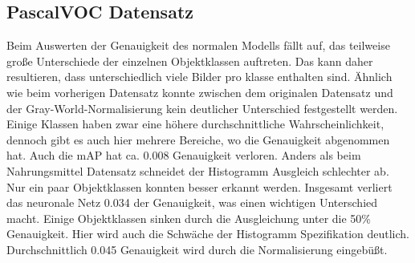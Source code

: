 \documentclass[a4paper,12pt,oneside]{article}
\begin{document}
\subsection{PascalVOC Datensatz}
Beim Auswerten der Genauigkeit des normalen Modells fällt auf, das teilweise große Unterschiede der einzelnen Objektklassen auftreten. Das kann daher resultieren, dass unterschiedlich viele Bilder pro klasse enthalten sind. Ähnlich wie beim vorherigen Datensatz konnte zwischen dem originalen Datensatz und der Gray-World-Normalisierung kein deutlicher Unterschied festgestellt werden. Einige Klassen haben zwar eine höhere durchschnittliche Wahrscheinlichkeit, dennoch gibt es auch hier mehrere Bereiche, wo die Genauigkeit abgenommen hat. Auch die mAP hat ca. 0.008 Genauigkeit verloren. Anders als beim Nahrungsmittel Datensatz schneidet der Histogramm Ausgleich schlechter ab. Nur ein paar Objektklassen konnten besser erkannt werden. Insgesamt verliert das neuronale Netz 0.034 der Genauigkeit, was einen wichtigen Unterschied macht. Einige Objektklassen sinken durch die Ausgleichung unter die 50\% Genauigkeit. Hier wird auch die Schwäche der Histogramm Spezifikation deutlich. Durchschnittlich 0.045 Genauigkeit wird durch die Normalisierung eingebüßt. 
\end{document}
